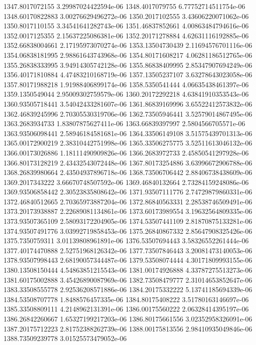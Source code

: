 {1347.8017072155 3.29987024422594e-06
1348.4017079755 6.77752714511754e-06
1348.60170822883 3.00276629496272e-06
1350.2017102555 3.43606220071062e-06
1350.8017110155 3.34541641282743e-06
1351.46837852661 4.00863484794616e-06
1352.0017125355 2.15637225086381e-06
1352.20171278884 4.62631116192885e-06
1352.66838004661 2.17195973070274e-06
1353.13504730439 2.11694576701116e-06
1354.06838181995 2.98861643743968e-06
1354.80171608217 4.06281186512765e-06
1355.26838333995 3.94914305742128e-06
1355.86838409995 2.85347907694249e-06
1356.40171810884 4.47483210168719e-06
1357.13505237107 3.63278643023058e-06
1357.80171988218 1.91988406899174e-06
1358.5350541444 4.06635438461397e-06
1359.1350549044 2.95009302759579e-06
1360.20172292218 4.63841910353543e-06
1360.93505718441 3.54042433281607e-06
1361.86839169996 3.65522412573832e-06
1362.46839245996 2.70305530319706e-06
1362.73505946441 3.52579014867495e-06
1363.2683934733 1.83807875627411e-06
1363.66839397997 2.5804566705571e-06
1363.93506098441 2.58946184581681e-06
1364.33506149108 3.51575439701313e-06
1365.00172900219 2.38310442751998e-06
1365.33506275775 3.52511613046132e-06
1366.00173026886 1.18111490909826e-06
1366.2683972733 2.45850541297928e-06
1366.80173128219 2.43432543072448e-06
1367.80173254886 3.63996672906788e-06
1368.26839980664 2.43504937896718e-06
1368.73506706442 2.88406738438609e-06
1369.2017343222 3.66670748507592e-06
1369.46840132664 2.73284159248086e-06
1369.93506858442 2.30523835808642e-06
1371.93507111776 2.74729879860331e-06
1372.46840512665 2.70365973887204e-06
1372.86840563331 2.28538746509491e-06
1373.20173938887 2.22689081134861e-06
1373.60173989554 3.19632564809335e-06
1373.93507365109 2.58093172204905e-06
1374.53507441109 2.81870875133281e-06
1374.93507491776 3.03992719858453e-06
1375.26840867332 2.85647908325426e-06
1375.7350759311 3.01139808961891e-06
1376.53507694443 3.58326552261444e-06
1377.40174470888 2.52751968126342e-06
1377.73507846443 3.20081473140053e-06
1378.93507998443 2.68190057344487e-06
1379.53508074444 4.30171809993155e-06
1380.13508150444 4.54863851215543e-06
1381.00174926888 4.33787275513273e-06
1381.60175002888 3.45426890087969e-06
1382.73508479777 2.31014653852647e-06
1383.33508555778 2.92536208571886e-06
1384.20175332222 5.13741185694339e-06
1384.53508707778 1.8488576457335e-06
1384.80175408222 3.51780163146697e-06
1385.33508809111 4.2148962131391e-06
1386.00175560222 2.06328414395197e-06
1386.26842260667 1.65327199217203e-06
1386.80175661556 3.02352958326091e-06
1387.20175712223 2.81752388262739e-06
1388.00175813556 2.98410935049846e-06
1388.73509239778 3.01525573479052e-06
}
